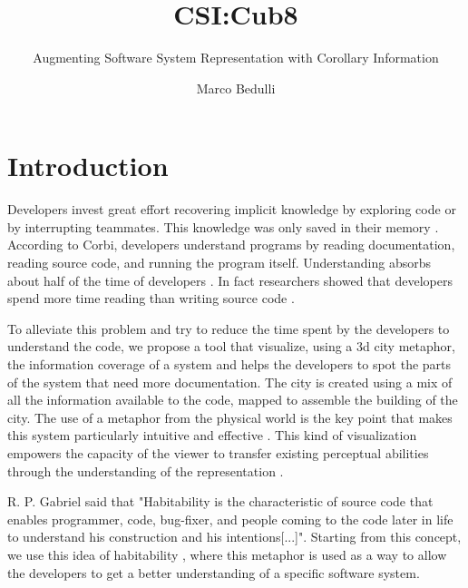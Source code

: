 \documentclass[]{usiinfbachelorproject}
\author{Marco Bedulli}
\title{CSI:Cub8}
\subtitle{Augmenting Software System Representation with Corollary Information}
\begin{document}
\maketitle

\tableofcontents 
\newpage


\listoffigures
\newpage


\section{Introduction} \label{introduction}



Developers invest great effort recovering implicit knowledge by exploring code or by interrupting teammates. This knowledge was only saved in their memory \cite{LaToza}.
According to Corbi, developers understand programs by reading documentation, reading source code, and running the program itself\cite{Corbi}. Understanding absorbs about half of the time of developers \cite{Corbi,Guimaraes}. In fact researchers showed that developers spend more time reading than writing source code \cite{Mayrhauser}.

To alleviate this problem and try to reduce the time spent by the developers to understand the code, we propose a tool that visualize, using a 3d city metaphor, the information coverage of a system and helps the developers to spot the parts of the system that need more documentation. 
The city is created using a mix of all the information available to the code, mapped to assemble the building of the city. The use of a metaphor from the physical world is the key point that makes this system particularly intuitive and effective \cite{SoftwareWorld}. This kind of visualization empowers the capacity of the viewer to transfer existing perceptual abilities through the understanding of the representation \cite{programComp}.

R. P. Gabriel \cite{Gabriel} said that "Habitability is the characteristic of source code that enables programmer, code, bug-fixer, and people coming to the code later in life to understand his construction and his intentions[...]". 
Starting from this concept, we use this idea of habitability \cite{vssac}, where this metaphor is used as a way to allow the developers to get a better understanding of a specific software system. 
\end{document}
